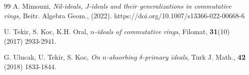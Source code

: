 \documentclass[preprint,review,10pt]{amsart}
\theoremstyle{definition}
\theoremstyle{remark}
\numberwithin{equation}{section}
\begin{document}
\begin{thebibliography}{99}
A. Mimouni, {\it Nil-ideals, $J$-ideals and their generalizations in
commutative rings,}  Beitr. Algebra Geom., (2022). https://doi.org/10.1007/s13366-022-00668-6


U. Tekir, S. Koc, K.H. Oral, {\it $n$-ideals of commutative rings}, Filomat, {\bf 31}(10) (2017) 2933-2941.

G. Ulucak, U. Tekir, S. Koc, {\it On $n$-absorbing $\delta$-primary ideals}, Turk J. Math., {\bf 42} (2018) 1833-1844.

\end{thebibliography}
\end{document}
